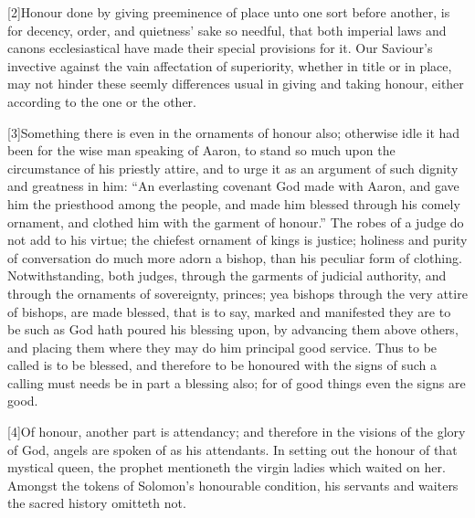 [2]Honour done by giving preeminence of place unto one sort before another, is for decency, order, and quietness’ sake so needful, that both imperial laws and canons ecclesiastical have made their special provisions for it. Our  Saviour’s invective against the vain affectation of superiority, whether in title or in place, may not hinder these seemly differences usual in giving and taking honour, either according to the one or the other.

[3]Something there is even in the ornaments of honour also; otherwise idle it had been for the wise man speaking of Aaron, to stand so much upon the circumstance of his priestly attire, and to urge it as an argument of such dignity and greatness in him: “An everlasting covenant God made with Aaron, and gave him the priesthood among the people, and made him blessed through his comely ornament, and clothed him with the garment of honour.” The robes of a judge do not add to his virtue; the chiefest ornament of kings is justice; holiness and purity of conversation do much more adorn a bishop, than his peculiar form of clothing. Notwithstanding, both judges, through the garments of judicial authority, and through the ornaments of sovereignty, princes; yea bishops through the very attire of bishops, are made blessed, that is to say, marked and manifested they are to be such as God hath poured his blessing upon, by advancing them above others, and placing them where they may do him principal good service. Thus to be called is to be blessed, and therefore to be honoured with the signs of such a calling must needs be in part a blessing also; for of good things even the signs are good.

[4]Of honour, another part is attendancy; and therefore in the visions of the glory of God, angels are spoken of as his attendants. In setting out the honour of that mystical queen, the prophet mentioneth the virgin ladies which waited on her. Amongst the tokens of Solomon’s honourable condition, his servants and waiters the sacred history omitteth not.

